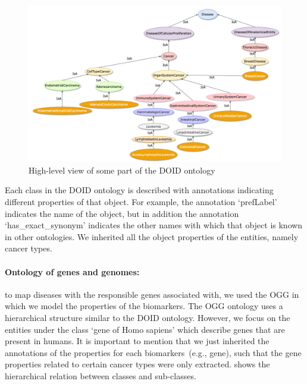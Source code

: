 \begin{figure}
	\centering
	\includegraphics[scale=0.5]{images/do.png}
	\caption{High-level view of some part of the DOID ontology} 
	\label{fig:oncoontology14}
	\vspace{-2mm}
\end{figure}

\hspace*{3.5mm} Each class in the DOID ontology is described with annotations indicating different properties of that object. For example, the annotation `prefLabel' indicates the name of the object, but in addition the annotation `has\_exact\_synonym' indicates the other names with which that object is known in other ontologies. We inherited all the object properties of the entities, namely cancer types.

\paragraph{Ontology of genes and genomes:} \hspace*{-2.5mm} to map diseases with the responsible genes associated with, we used the OGG in which we model the properties of the biomarkers. The OGG ontology uses a hierarchical structure similar to the DOID ontology. However, we focus on the entities under the class `gene of Homo sapiens' which describe genes that are present in humans. It is important to mention that we just inherited the annotations of the properties for each biomarkers~(e.g., gene), such that the gene properties related to certain cancer types were only extracted.  shows the hierarchical relation between classes and sub-classes.\\


